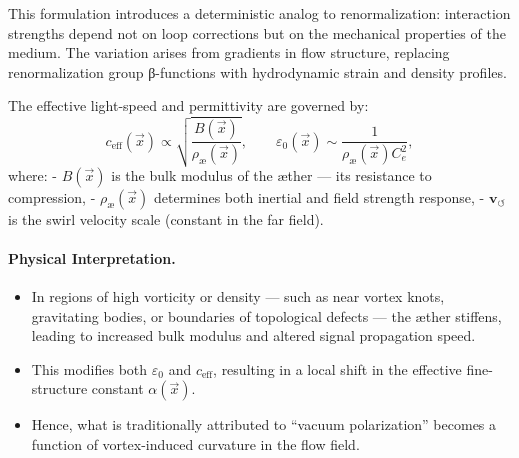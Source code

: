 \documentclass[12pt]{article}
\begin{document}
This formulation introduces a deterministic analog to renormalization: interaction strengths depend not on loop corrections but on the mechanical properties of the medium. The variation arises from gradients in flow structure, replacing renormalization group β-functions with hydrodynamic strain and density profiles.

\vspace{0.5em}

The effective light-speed and permittivity are governed by:
\begin{equation}
    c_{\text{eff}}(\vec{x}) \propto \sqrt{ \frac{B(\vec{x})}{\rho_\text{\ae}(\vec{x})} }, \qquad
    \varepsilon_0(\vec{x}) \sim \frac{1}{\rho_\text{\ae}(\vec{x}) C_e^2},
\end{equation}
where:
- \( B(\vec{x}) \) is the bulk modulus of the æther — its resistance to compression,
- \( \rho_\text{\ae}(\vec{x}) \) determines both inertial and field strength response,
- \( \mathbf{v}_{\scriptscriptstyle\boldsymbol{\circlearrowleft}} \) is the swirl velocity scale (constant in the far field).

\vspace{0.5em}

\paragraph{Physical Interpretation.}
\begin{itemize}
    \item In regions of high vorticity or density — such as near vortex knots, gravitating bodies, or boundaries of topological defects — the æther stiffens, leading to increased bulk modulus and altered signal propagation speed.
    \item This modifies both \( \varepsilon_0 \) and \( c_{\text{eff}} \), resulting in a local shift in the effective fine-structure constant \( \alpha(\vec{x}) \).
    \item Hence, what is traditionally attributed to “vacuum polarization” becomes a function of vortex-induced curvature in the flow field.
\end{itemize}

\vspace{0.5em}
\end{document}
